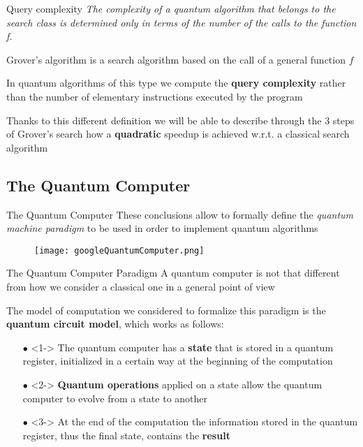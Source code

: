 		\begin{frame}{Query complexity}
			\small
			\emph{The complexity of a quantum algorithm that belongs to the search class is determined only in terms of the number of the calls to the function f.}
			
			\vspace{0.3cm}
			
			Grover's algorithm is a search algorithm based on the call of a general function $f$\\
			
			\vspace{0.2cm}
			
			In quantum algorithms of this type we compute the \textbf{query complexity} rather than the number of elementary instructions executed by the program \\
			
			\vspace{0.2cm}
			
			Thanks to this different definition we will be able to describe through the 3 steps of Grover's search how a \textbf{quadratic} speedup is achieved w.r.t. a classical search algorithm
		\end{frame}
	
	\subsection{The Quantum Computer}
		\begin{frame}{The Quantum Computer}
			\small
			These conclusions allow to formally define the \emph{quantum machine paradigm} to be used in order to implement quantum algorithms
			\begin{figure}[h]
				\centering
				\texttt{[image: googleQuantumComputer.png]}
			\end{figure}
		\end{frame}
	
		\begin{frame}{The Quantum Computer Paradigm}
			A quantum computer is not that different from how we consider a classical one in a general point of view\\
			
			\vspace{0.3cm}
			
			The model of computation we considered to formalize this paradigm is the \textbf{quantum circuit model}, which works as follows:
			\begin{itemize}
				\item[$\bullet$] <1-> The quantum computer has a \textbf{state} that is stored in a quantum register, initialized in a certain way at the beginning of the computation
				
				\item[$\bullet$] <2-> \textbf{Quantum operations} applied on a state allow the quantum computer to evolve from a state to another
				
				\item[$\bullet$] <3-> At the end of the computation the information stored in the quantum register, thus the final state, contains the \textbf{result}
			\end{itemize}
		\end{frame}
	
